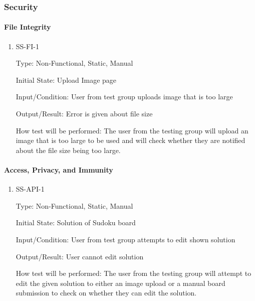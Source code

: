 \documentclass[11pt]{article}
\begin{document}
\subsubsection{Security}

\paragraph{File Integrity}

\begin{enumerate}

\item{SS-FI-1\\}

Type: Non-Functional, Static, Manual
					
Initial State: Upload Image page
					
Input/Condition: User from test group uploads image that is too large
					
Output/Result: Error is given about file size 
					
How test will be performed: The user from the testing group will upload an image that is too large to be used and will check whether they are notified about the file size being too large.

\end{enumerate}

\paragraph{Access, Privacy, and Immunity}

\begin{enumerate}

\item{SS-API-1\\}

Type: Non-Functional, Static, Manual
					
Initial State: Solution of Sudoku board
					
Input/Condition: User from test group attempts to edit shown solution
					
Output/Result: User cannot edit solution
					
How test will be performed: The user from the testing group will attempt to edit the given solution to either an image upload or a manual board submission to check on whether they can edit the solution.

\end{enumerate}

\newpage
\end{document}
